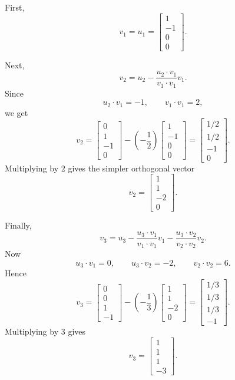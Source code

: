 \documentclass[12pt]{article}
\begin{document}
First,
\[
v_1=u_1=
\begin{bmatrix}1\\-1\\0\\0\end{bmatrix}.
\]

Next,
\[
v_2
=
u_2-\frac{u_2\cdot v_1}{v_1\cdot v_1}v_1.
\]
Since
\[
u_2\cdot v_1=-1,
\qquad
v_1\cdot v_1=2,
\]
we get
\[
v_2
=
\begin{bmatrix}0\\1\\-1\\0\end{bmatrix}
-\left(-\frac12\right)
\begin{bmatrix}1\\-1\\0\\0\end{bmatrix}
=
\begin{bmatrix}1/2\\1/2\\-1\\0\end{bmatrix}.
\]
Multiplying by $2$ gives the simpler orthogonal vector
\[
v_2=
\begin{bmatrix}1\\1\\-2\\0\end{bmatrix}.
\]

Finally,
\[
v_3
=
u_3
-\frac{u_3\cdot v_1}{v_1\cdot v_1}v_1
-\frac{u_3\cdot v_2}{v_2\cdot v_2}v_2.
\]
Now
\[
u_3\cdot v_1=0,
\qquad
u_3\cdot v_2=-2,
\qquad
v_2\cdot v_2=6.
\]
Hence
\[
v_3
=
\begin{bmatrix}0\\0\\1\\-1\end{bmatrix}
-\left(-\frac13\right)
\begin{bmatrix}1\\1\\-2\\0\end{bmatrix}
=
\begin{bmatrix}1/3\\1/3\\1/3\\-1\end{bmatrix}.
\]
Multiplying by $3$ gives
\[
v_3=
\begin{bmatrix}1\\1\\1\\-3\end{bmatrix}.
\]
\end{document}
